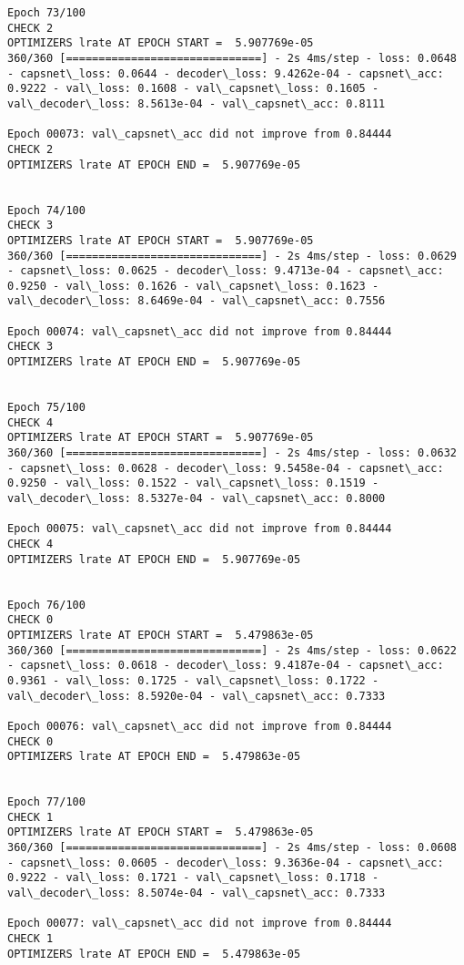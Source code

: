 \documentclass[11pt]{article}
\begin{document}
\begin{Verbatim}[commandchars=\\\{\}]
Epoch 73/100
CHECK 2
OPTIMIZERS lrate AT EPOCH START =  5.907769e-05
360/360 [==============================] - 2s 4ms/step - loss: 0.0648 - capsnet\_loss: 0.0644 - decoder\_loss: 9.4262e-04 - capsnet\_acc: 0.9222 - val\_loss: 0.1608 - val\_capsnet\_loss: 0.1605 - val\_decoder\_loss: 8.5613e-04 - val\_capsnet\_acc: 0.8111

Epoch 00073: val\_capsnet\_acc did not improve from 0.84444
CHECK 2
OPTIMIZERS lrate AT EPOCH END =  5.907769e-05 


Epoch 74/100
CHECK 3
OPTIMIZERS lrate AT EPOCH START =  5.907769e-05
360/360 [==============================] - 2s 4ms/step - loss: 0.0629 - capsnet\_loss: 0.0625 - decoder\_loss: 9.4713e-04 - capsnet\_acc: 0.9250 - val\_loss: 0.1626 - val\_capsnet\_loss: 0.1623 - val\_decoder\_loss: 8.6469e-04 - val\_capsnet\_acc: 0.7556

Epoch 00074: val\_capsnet\_acc did not improve from 0.84444
CHECK 3
OPTIMIZERS lrate AT EPOCH END =  5.907769e-05 


Epoch 75/100
CHECK 4
OPTIMIZERS lrate AT EPOCH START =  5.907769e-05
360/360 [==============================] - 2s 4ms/step - loss: 0.0632 - capsnet\_loss: 0.0628 - decoder\_loss: 9.5458e-04 - capsnet\_acc: 0.9250 - val\_loss: 0.1522 - val\_capsnet\_loss: 0.1519 - val\_decoder\_loss: 8.5327e-04 - val\_capsnet\_acc: 0.8000

Epoch 00075: val\_capsnet\_acc did not improve from 0.84444
CHECK 4
OPTIMIZERS lrate AT EPOCH END =  5.907769e-05 


Epoch 76/100
CHECK 0
OPTIMIZERS lrate AT EPOCH START =  5.479863e-05
360/360 [==============================] - 2s 4ms/step - loss: 0.0622 - capsnet\_loss: 0.0618 - decoder\_loss: 9.4187e-04 - capsnet\_acc: 0.9361 - val\_loss: 0.1725 - val\_capsnet\_loss: 0.1722 - val\_decoder\_loss: 8.5920e-04 - val\_capsnet\_acc: 0.7333

Epoch 00076: val\_capsnet\_acc did not improve from 0.84444
CHECK 0
OPTIMIZERS lrate AT EPOCH END =  5.479863e-05 


Epoch 77/100
CHECK 1
OPTIMIZERS lrate AT EPOCH START =  5.479863e-05
360/360 [==============================] - 2s 4ms/step - loss: 0.0608 - capsnet\_loss: 0.0605 - decoder\_loss: 9.3636e-04 - capsnet\_acc: 0.9222 - val\_loss: 0.1721 - val\_capsnet\_loss: 0.1718 - val\_decoder\_loss: 8.5074e-04 - val\_capsnet\_acc: 0.7333

Epoch 00077: val\_capsnet\_acc did not improve from 0.84444
CHECK 1
OPTIMIZERS lrate AT EPOCH END =  5.479863e-05 



\end{Verbatim}
\end{document}

